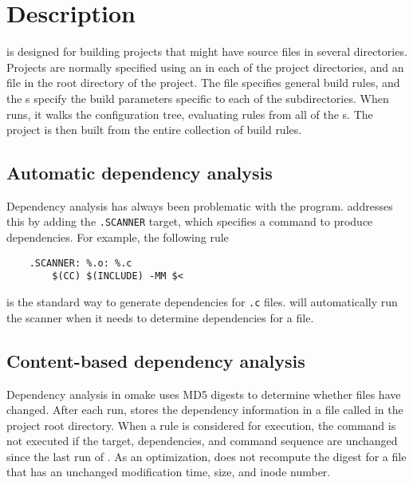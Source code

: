 %
\section{Description}

 is designed for building projects that might have source files in several directories.
Projects are normally specified using an  in each of the project directories, and an
 file in the root directory of the project.  The  file specifies
general build rules, and the s specify the build parameters specific to each of the
subdirectories.  When  runs, it walks the configuration tree, evaluating rules from all
of the s.  The project is then built from the entire collection of build rules.

\subsection{Automatic dependency analysis}

Dependency analysis has always been problematic with the  program.  
addresses this by adding the \verb+.SCANNER+ target, which specifies a command to produce
dependencies.  For example, the following rule

\begin{verbatim}
    .SCANNER: %.o: %.c
        $(CC) $(INCLUDE) -MM $<
\end{verbatim}

is the standard way to generate dependencies for \verb+.c+ files.   will automatically
run the scanner when it needs to determine dependencies for a file.

\subsection{Content-based dependency analysis}

Dependency analysis in omake uses MD5 digests to determine whether files have changed.  After each
run,  stores the dependency information in a file called  in the project
root directory.  When a rule is considered for execution, the command is not executed if the target,
dependencies, and command sequence are unchanged since the last run of .  As an
optimization,  does not recompute the digest for a file that has an unchanged
modification time, size, and inode number.

